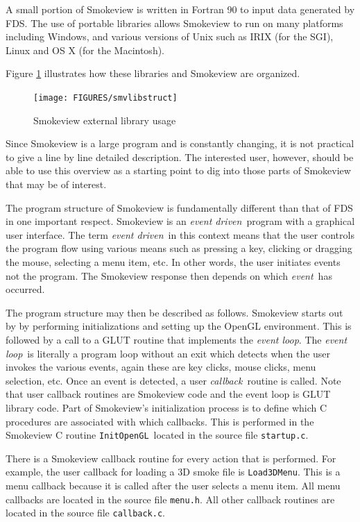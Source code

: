 \documentclass[11pt,twoside]{book}
\begin{document}
A small portion of Smokeview is written in Fortran 90 to input
data generated by FDS.  The use of portable libraries allows
Smokeview to run on many platforms including Windows, and various
versions of Unix such as IRIX (for the SGI), Linux and OS X (for
the Macintosh).

Figure \ref{smvlibstruct} illustrates how these libraries and
Smokeview are organized.

\begin{figure}
\texttt{[image: FIGURES/smvlibstruct]}
\caption{Smokeview external library usage}
\label{smvlibstruct}
\end{figure}


Since Smokeview is a large program and is constantly changing, it
is not practical to give a line by line detailed description. The
interested user, however, should be able to use this overview as a
starting point to dig into those parts of Smokeview that may be of
interest.

The program structure of Smokeview is fundamentally different than
that of FDS in one important respect.  Smokeview is an {\em event
driven}\ program with a graphical user interface.  The term {\em
event driven}\ in this context means that the user controls the
program flow using various means such as pressing a key, clicking
or dragging the mouse, selecting a menu item, etc.  In other
words, the user initiates events not the program. The Smokeview
response then depends on which {\em event}\ has occurred.

The program structure may then be described as follows. Smokeview
starts out by by performing initializations and setting up the
OpenGL environment. This is followed by a call to a GLUT routine
that implements the {\em event loop}. The {\em event loop}\ is
literally a program loop without an exit which detects when the
user invokes the various events, again these are key clicks, mouse
clicks, menu selection, etc. Once an event is detected, a
user {\em callback}\ routine is called.  Note that user callback
routines are Smokeview code and the event loop is GLUT library
code. Part of Smokeview's initialization process is to define
which C procedures are associated with which callbacks.  This is
performed in the Smokeview C routine {\tt InitOpenGL}\ located in
the source file {\tt startup.c}.

There is a Smokeview callback routine for every action that is
performed.  For example, the user callback for loading a 3D smoke
file is {\tt Load3DMenu}.  This is a menu callback because it is
called after the user selects a menu item.  All menu callbacks are
located in the source file {\tt menu.h}.  All other callback
routines are located in the source file {\tt callback.c}.
\end{document}

